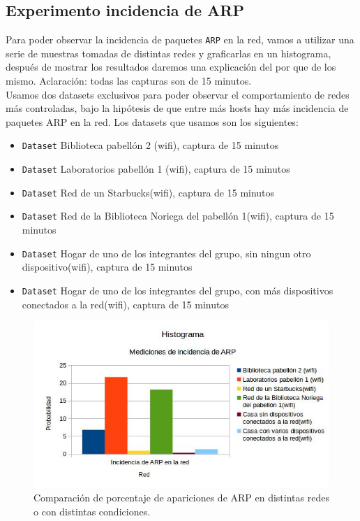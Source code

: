 
\subsection{Experimento incidencia de ARP}

Para poder observar la incidencia de paquetes \texttt{ARP} en la red, vamos a utilizar una serie de muestras tomadas de distintas redes y graficarlas en un histograma, 
después de mostrar los resultados daremos una explicación del por que de los mismo. Aclaración: todas las capturas son de 15 minutos.\\

Usamos dos datasets exclusivos para poder observar el comportamiento de redes más controladas, bajo la hipótesis de que entre más hosts hay más incidencia de paquetes ARP 
en la red. Los datasets que usamos son los siguientes:\\

\begin{itemize}
    \item \texttt{Dataset} Biblioteca pabellón 2 (wifi), captura de 15 minutos
    \item \texttt{Dataset} Laboratorios pabellón 1 (wifi), captura de 15 minutos
    \item \texttt{Dataset} Red de un Starbucks(wifi), captura de 15 minutos
    \item \texttt{Dataset} Red de la Biblioteca Noriega del pabellón 1(wifi), captura de 15 minutos
    \item \texttt{Dataset} Hogar de uno de los integrantes del grupo, sin ningun otro dispositivo(wifi), captura de 15 minutos
    \item \texttt{Dataset} Hogar de uno de los integrantes del grupo, con más dispositivos conectados a la red(wifi), captura de 15 minutos
\end{itemize}

\begin{figure}[H]
\centering
\includegraphics[width=150mm]{imagenes/IncidenciaARP.jpg}
\caption{Comparación de porcentaje de apariciones de ARP en distintas redes o con distintas condiciones.\label{overflow}}
\end{figure}

